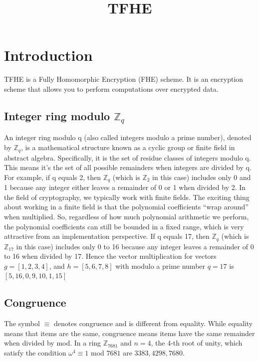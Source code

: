 \documentclass{techrep}
\title{TFHE}
\theoremstyle{definition}
\theoremstyle{plain}
\newcommand{\Z}{\mathbb{Z}}
\begin{document}
	\maketitle

	\section{Introduction}
TFHE is a Fully Homomorphic Encryption (FHE) scheme. It is an encryption scheme that allows you to perform computations over encrypted data. 

 	\subsection{Integer ring modulo $\Z_{q}$}
	An integer ring modulo q (also called integers modulo a prime number), denoted by $\Z_{q}$, is a mathematical structure known as a cyclic group or finite field in abstract algebra. Specifically, it is the set of residue classes of integers modulo q. This means it's the set of all possible remainders when integers are divided by q. For example, if q equals 2, then $\Z_{q}$ (which is $\Z_{2}$ in this case) includes only 0 and 1 because any integer either leaves a remainder of 0 or 1 when divided by 2. In the field of cryptography, we typically work with finite fields. The exciting thing about working in a finite field is that the polynomial coefficients “wrap around” when multiplied. So, regardless of how much polynomial arithmetic we perform, the polynomial coefficients can still be bounded in a fixed range, which is very attractive from an implementation perspective. If q equals 17, then $\Z_{q}$ (which is $\Z_{17}$ in this case) includes only 0 to 16 because any integer leaves a remainder of 0 to 16 when divided by 17. Hence the vector multiplication for vectors $g = [1, 2, 3, 4]$, and $h = [5, 6, 7, 8]$ with modulo a prime number $q = 17$ is  $[5, 16, 0, 9, 10, 1, 15]$

	\subsection{Congruence}
	The symbol $\equiv$ denotes congruence and is different from equality. While equality means that items are the same, congruence means items have the same remainder when divided by mod. In a ring $\Z_{7681}$  and $n = 4$, the 4-th root of unity, which satisfy the condition $\omega^4 \equiv 1$ mod $7681$ are ${3383, 4298, 7680}$.
\end{document}

